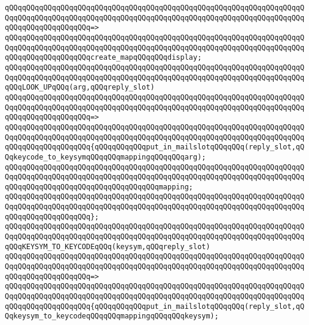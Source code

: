 \verb|qQQqqQQqqQQqqQQqqQQqqQQqqQQqqQQqqQQqqQQqqQQqqQQqqQQqqQQqqQQqqQQqqQQqqQQqqQQqqQQqqQQqqQQqqQQqqQQqqQQqqQQqqQQqqQQqqQQqqQQqqQQqqQQqqQQqqQQqqQQqqQQqqQQqqQQqqQQqqQQq=>|\newline
\verb|qQQqqQQqqQQqqQQqqQQqqQQqqQQqqQQqqQQqqQQqqQQqqQQqqQQqqQQqqQQqqQQqqQQqqQQqqQQqqQQqqQQqqQQqqQQqqQQqqQQqqQQqqQQqqQQqqQQqqQQqqQQqqQQqqQQqqQQqqQQqqQQqqQQqqQQqqQQqqQQqcreate_mapqQQqqQQqdisplay;|\newline
\newline
\verb|qQQqqQQqqQQqqQQqqQQqqQQqqQQqqQQqqQQqqQQqqQQqqQQqqQQqqQQqqQQqqQQqqQQqqQQqqQQqqQQqqQQqqQQqqQQqqQQqqQQqqQQqqQQqqQQqqQQqqQQqqQQqqQQqqQQqqQQqqQQqqQQqLOOK_UPqQQq(arg,qQQqreply_slot)|\newline
\verb|qQQqqQQqqQQqqQQqqQQqqQQqqQQqqQQqqQQqqQQqqQQqqQQqqQQqqQQqqQQqqQQqqQQqqQQqqQQqqQQqqQQqqQQqqQQqqQQqqQQqqQQqqQQqqQQqqQQqqQQqqQQqqQQqqQQqqQQqqQQqqQQqqQQqqQQqqQQqqQQq=>|\newline
\verb|qQQqqQQqqQQqqQQqqQQqqQQqqQQqqQQqqQQqqQQqqQQqqQQqqQQqqQQqqQQqqQQqqQQqqQQqqQQqqQQqqQQqqQQqqQQqqQQqqQQqqQQqqQQqqQQqqQQqqQQqqQQqqQQqqQQqqQQqqQQqqQQqqQQqqQQqqQQqqQQq{qQQqqQQqqQQqput_in_mailslotqQQqqQQq(reply_slot,qQQqkeycode_to_keysymqQQqqQQqmappingqQQqqQQqarg);|\newline
\newline
\verb|qQQqqQQqqQQqqQQqqQQqqQQqqQQqqQQqqQQqqQQqqQQqqQQqqQQqqQQqqQQqqQQqqQQqqQQqqQQqqQQqqQQqqQQqqQQqqQQqqQQqqQQqqQQqqQQqqQQqqQQqqQQqqQQqqQQqqQQqqQQqqQQqqQQqqQQqqQQqqQQqqQQqqQQqqQQqqQQqmapping;|\newline
\verb|qQQqqQQqqQQqqQQqqQQqqQQqqQQqqQQqqQQqqQQqqQQqqQQqqQQqqQQqqQQqqQQqqQQqqQQqqQQqqQQqqQQqqQQqqQQqqQQqqQQqqQQqqQQqqQQqqQQqqQQqqQQqqQQqqQQqqQQqqQQqqQQqqQQqqQQqqQQqqQQq};|\newline
\newline
\verb|qQQqqQQqqQQqqQQqqQQqqQQqqQQqqQQqqQQqqQQqqQQqqQQqqQQqqQQqqQQqqQQqqQQqqQQqqQQqqQQqqQQqqQQqqQQqqQQqqQQqqQQqqQQqqQQqqQQqqQQqqQQqqQQqqQQqqQQqqQQqqQQqKEYSYM_TO_KEYCODEqQQq(keysym,qQQqreply_slot)|\newline
\verb|qQQqqQQqqQQqqQQqqQQqqQQqqQQqqQQqqQQqqQQqqQQqqQQqqQQqqQQqqQQqqQQqqQQqqQQqqQQqqQQqqQQqqQQqqQQqqQQqqQQqqQQqqQQqqQQqqQQqqQQqqQQqqQQqqQQqqQQqqQQqqQQqqQQqqQQqqQQqqQQq=>|\newline
\verb|qQQqqQQqqQQqqQQqqQQqqQQqqQQqqQQqqQQqqQQqqQQqqQQqqQQqqQQqqQQqqQQqqQQqqQQqqQQqqQQqqQQqqQQqqQQqqQQqqQQqqQQqqQQqqQQqqQQqqQQqqQQqqQQqqQQqqQQqqQQqqQQqqQQqqQQqqQQqqQQq{qQQqqQQqqQQqput_in_mailslotqQQqqQQq(reply_slot,qQQqkeysym_to_keycodeqQQqqQQqmappingqQQqqQQqkeysym);|\newline
